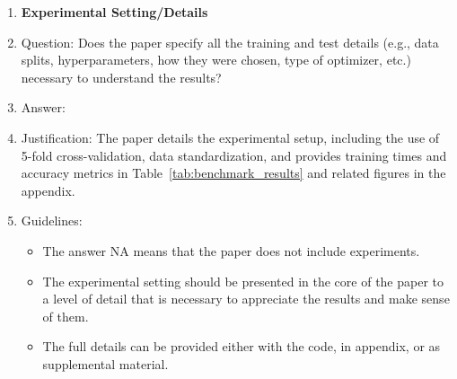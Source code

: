 \documentclass{article}
\begin{document}
\begin{enumerate}
\item {\bf Experimental Setting/Details}
    \item[] Question: Does the paper specify all the training and test details (e.g., data splits, hyperparameters, how they were chosen, type of optimizer, etc.) necessary to understand the results?
    \item[] Answer: \answerYes{}
    \item[] Justification: The paper details the experimental setup, including the use of 5-fold cross-validation, data standardization, and provides training times and accuracy metrics in Table~\ref{tab:benchmark_results} and related figures in the appendix.
    \item[] Guidelines:
    \begin{itemize}
        \item The answer NA means that the paper does not include experiments.
        \item The experimental setting should be presented in the core of the paper to a level of detail that is necessary to appreciate the results and make sense of them.
        \item The full details can be provided either with the code, in appendix, or as supplemental material.
    \end{itemize}


\end{enumerate}
\end{document}
